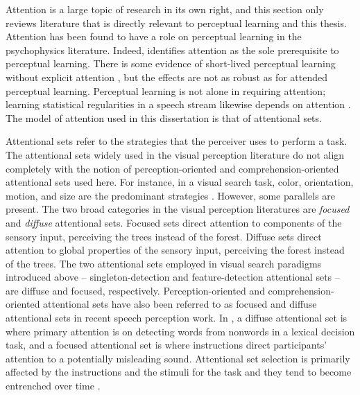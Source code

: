 Attention is a large topic of research in its own right, and this section only reviews literature that is directly relevant to perceptual learning and this thesis.
Attention has been found to have a role on perceptual learning in the psychophysics literature. 
Indeed, \citet{Gibson1953} identifies attention as the sole prerequisite to perceptual learning.
There is some evidence of short-lived perceptual learning without explicit attention \citep{Watanabe2001}, but the effects are not as robust as for attended perceptual learning.
Perceptual learning is not alone in requiring attention; learning statistical regularities in a speech stream likewise depends on attention \citep{Toro2005}.
The model of attention used in this dissertation is that of attentional sets.

Attentional sets refer to the strategies that the perceiver uses to perform a task.
The attentional sets widely used in the visual perception literature do not align completely with the notion of perception-oriented and comprehension-oriented attentional sets used here.
For instance, in a visual search task, color, orientation, motion, and size are the predominant strategies \citep{Wolfe2004}.
However, some parallels are present.
The two broad categories in the visual perception literatures are \emph{focused} and \emph{diffuse} attentional sets.
Focused sets direct attention to components of the sensory input, perceiving the trees instead of the forest. 
Diffuse sets direct attention to global properties of the sensory input, perceiving the forest instead of the trees.  
The two attentional sets employed in visual search paradigms introduced above -- singleton-detection and feature-detection attentional sets -- are diffuse and focused, respectively.
Perception-oriented and comprehension-oriented attentional sets have also been referred to as focused and diffuse attentional sets in recent speech perception work.
In \citet{Pitt2012}, a diffuse attentional set is where primary attention is on detecting words from nonwords in a lexical decision task, and a focused attentional set is where instructions direct participants' attention to a potentially misleading sound.
Attentional set selection is primarily affected by the instructions and the stimuli for the task and they tend to become entrenched over time \citep{Leber2006}.

